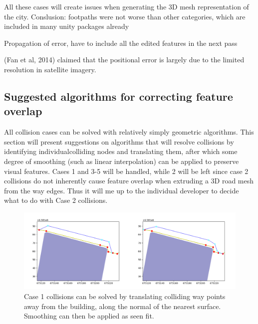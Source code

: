 \documentclass[a4paper]{article}
\begin{document}
All these cases will create issues when generating the 3D mesh representation of the city.
Conslusion: footpaths were not worse than other categories, which are included in many unity packages already

Propagation of error, have to include all the edited features in the next pass

(Fan et al, 2014) claimed that the positional error is largely due to the limited resolution in satellite imagery.

\subsection{Suggested algorithms for correcting feature overlap}

All collision cases can be solved with relatively simply geometric algorithms. This section will present suggestions on algorithms that will resolve collisions by identifying individualcolliding nodes and translating them, after which some degree of smoothing (such as linear interpolation) can be applied to preserve visual features. Cases 1 and 3-5 will be handled, while 2 will be left since case 2 collisions do not inherently cause feature overlap when extruding a 3D road mesh from the way edges. Thus it will me up to the individual developer to decide what to do with Case 2 collisions.

\begin{figure}[H]
    \centering
    \includegraphics[width=\textwidth,height=0.5\textheight,keepaspectratio]{img_feature_overlap_fix_1}
    \caption{Case 1 collisions can be solved by translating colliding way points away from the building, along the normal of the nearest surface. Smoothing can then be applied as seen fit.}
    \label{fig:space}
\end{figure}
\end{document}
